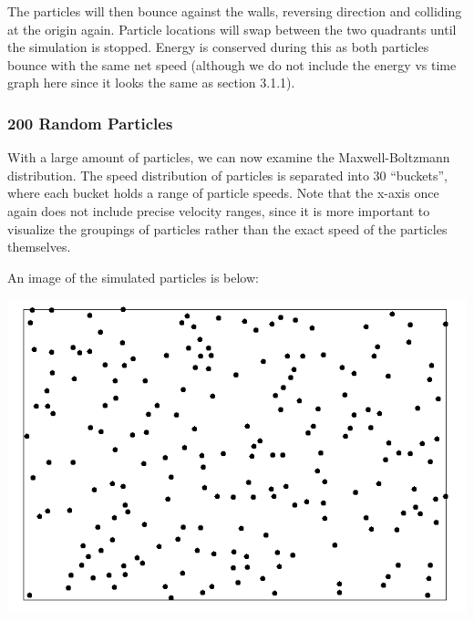 \documentclass{article}
\begin{document}
The particles will then bounce against the walls, reversing direction and colliding at the origin again.
Particle locations will swap between the two quadrants until the simulation is stopped.
Energy is conserved during this as both particles bounce with the same net speed
(although we do not include the energy vs time graph here since it looks the same as section 3.1.1).

\subsubsection{200 Random Particles}
With a large amount of particles, we can now examine the Maxwell-Boltzmann distribution.
The speed distribution of particles is separated into 30 ``buckets'',
where each bucket holds a range of particle speeds.
Note that the x-axis once again does not include precise velocity ranges,
since it is more important to visualize the groupings of particles rather than the exact speed of the particles themselves.

An image of the simulated particles is below:
\\
\begin{center}
    \includegraphics[scale=0.5]{uncharged_random}
\end{center}
\end{document}
